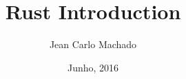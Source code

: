\usepackage{graphicx}
\usepackage[utf8]{inputenc}
\title{Rust Introduction}
\author{Jean Carlo Machado}
\date{Junho, 2016}
\usepackage[overlay,absolute]{textpos}
\usepackage{ragged2e}
\justifying
{}
\geometry{paperwidth=140mm,paperheight=105mm}
